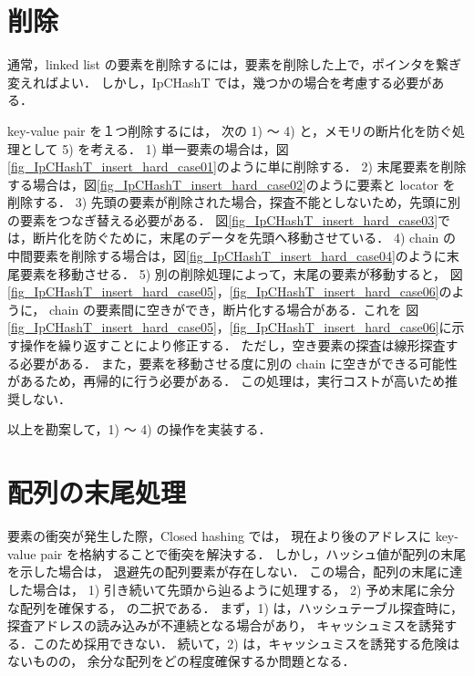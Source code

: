 \section{削除}

通常，linked list の要素を削除するには，要素を削除した上で，ポインタを繋ぎ変えればよい．
しかし，IpCHashT では，幾つかの場合を考慮する必要がある．

key-value pair を１つ削除するには，
次の 1) 〜 4) と，メモリの断片化を防ぐ処理として 5) を考える．
1) 単一要素の場合は，図\ref{fig_IpCHashT_insert_hard_case01}のように単に削除する．
2) 末尾要素を削除する場合は，図\ref{fig_IpCHashT_insert_hard_case02}のように要素と locator を削除する．
3) 先頭の要素が削除された場合，探査不能としないため，先頭に別の要素をつなぎ替える必要がある．
図\ref{fig_IpCHashT_insert_hard_case03}では，断片化を防ぐために，末尾のデータを先頭へ移動させている．
4) chain の中間要素を削除する場合は，図\ref{fig_IpCHashT_insert_hard_case04}のように末尾要素を移動させる．
5) 別の削除処理によって，末尾の要素が移動すると，
図\ref{fig_IpCHashT_insert_hard_case05}，\ref{fig_IpCHashT_insert_hard_case06}のように，
chain の要素間に空きができ，断片化する場合がある．これを
図\ref{fig_IpCHashT_insert_hard_case05}，\ref{fig_IpCHashT_insert_hard_case06}に示す操作を繰り返すことにより修正する．
ただし，空き要素の探査は線形探査する必要がある．
また，要素を移動させる度に別の chain に空きができる可能性があるため，再帰的に行う必要がある．
この処理は，実行コストが高いため推奨しない．

以上を勘案して，1) 〜 4) の操作を実装する．

\section{配列の末尾処理}

要素の衝突が発生した際，Closed hashing では，
現在より後のアドレスに key-value pair を格納することで衝突を解決する．
しかし，ハッシュ値が配列の末尾を示した場合は，
退避先の配列要素が存在しない．
この場合，配列の末尾に達した場合は，
1) 引き続いて先頭から辿るように処理する，
2) 予め末尾に余分な配列を確保する，
の二択である．
まず，1) は，ハッシュテーブル探査時に，
探査アドレスの読み込みが不連続となる場合があり，
キャッシュミスを誘発する．このため採用できない．
続いて，2) は，キャッシュミスを誘発する危険はないものの，
余分な配列をどの程度確保するか問題となる．

